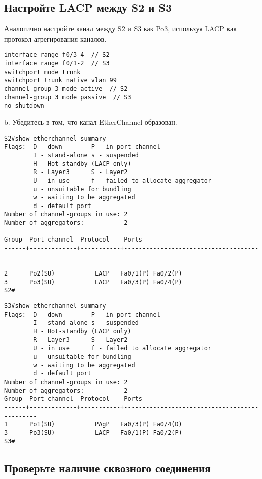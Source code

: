 \subsection{Настройте LACP между S2 и S3}

Аналогично настройте канал между S2 и S3 как Po3,
используя LACP как протокол агрегирования каналов.

\begin{verbatim}
interface range f0/3-4  // S2
interface range f0/1-2  // S3
switchport mode trunk
switchport trunk native vlan 99
channel-group 3 mode active  // S2
channel-group 3 mode passive  // S3
no shutdown
\end{verbatim}

b. Убедитесь в том, что канал EtherChannel образован.

\begin{verbatim}
S2#show etherchannel summary
Flags:  D - down        P - in port-channel
        I - stand-alone s - suspended
        H - Hot-standby (LACP only)
        R - Layer3      S - Layer2
        U - in use      f - failed to allocate aggregator
        u - unsuitable for bundling
        w - waiting to be aggregated
        d - default port
Number of channel-groups in use: 2
Number of aggregators:           2

Group  Port-channel  Protocol    Ports
------+-------------+-----------+----------------------------------------------

2      Po2(SU)           LACP   Fa0/1(P) Fa0/2(P) 
3      Po3(SU)           LACP   Fa0/3(P) Fa0/4(P) 
S2#
\end{verbatim}

\begin{verbatim}
S3#show etherchannel summary
Flags:  D - down        P - in port-channel
        I - stand-alone s - suspended
        H - Hot-standby (LACP only)
        R - Layer3      S - Layer2
        U - in use      f - failed to allocate aggregator
        u - unsuitable for bundling
        w - waiting to be aggregated
        d - default port
Number of channel-groups in use: 2
Number of aggregators:           2
Group  Port-channel  Protocol    Ports
------+-------------+-----------+----------------------------------------------
1      Po1(SU)           PAgP   Fa0/3(P) Fa0/4(D) 
3      Po3(SU)           LACP   Fa0/1(P) Fa0/2(P) 
S3#
\end{verbatim}

\subsection{Проверьте наличие сквозного соединения}

